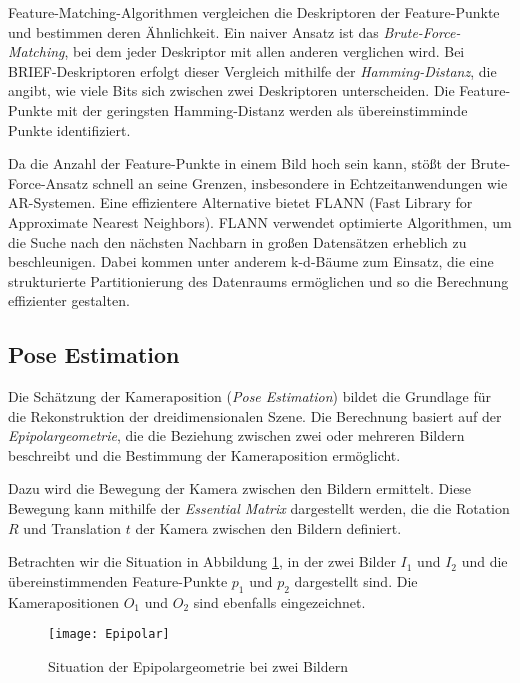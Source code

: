 Feature-Matching-Algorithmen vergleichen die Deskriptoren der Feature-Punkte und bestimmen deren Ähnlichkeit. Ein naiver Ansatz ist das \emph{Brute-Force-Matching}, bei dem jeder Deskriptor mit allen anderen verglichen wird. Bei BRIEF-Deskriptoren erfolgt dieser Vergleich mithilfe der \emph{Hamming-Distanz}, die angibt, wie viele Bits sich zwischen zwei Deskriptoren unterscheiden. Die Feature-Punkte mit der geringsten Hamming-Distanz werden als übereinstimminde Punkte identifiziert. \cite{gao2021vSLAM, szeliski2022computerVision}

Da die Anzahl der Feature-Punkte in einem Bild hoch sein kann, stößt der Brute-Force-Ansatz schnell an seine Grenzen, insbesondere in Echtzeitanwendungen wie AR-Systemen. Eine effizientere Alternative bietet FLANN (Fast Library for Approximate Nearest Neighbors). FLANN verwendet optimierte Algorithmen, um die Suche nach den nächsten Nachbarn in großen Datensätzen erheblich zu beschleunigen. Dabei kommen unter anderem k-d-Bäume zum Einsatz, die eine strukturierte Partitionierung des Datenraums ermöglichen und so die Berechnung effizienter gestalten. \cite{gao2021vSLAM, muja2009flann}

\subsection{Pose Estimation}

Die Schätzung der Kameraposition (\emph{Pose Estimation}) bildet die Grundlage für die Rekonstruktion der dreidimensionalen Szene. Die Berechnung basiert auf der \emph{Epipolargeometrie}, die die Beziehung zwischen zwei oder mehreren Bildern beschreibt und die Bestimmung der Kameraposition ermöglicht. \cite{gao2021vSLAM} 

Dazu wird die Bewegung der Kamera zwischen den Bildern ermittelt. Diese Bewegung kann mithilfe der \emph{Essential Matrix} dargestellt werden, die die Rotation \( R \) und Translation \( t \) der Kamera zwischen den Bildern definiert. \cite{gao2021vSLAM}

Betrachten wir die Situation in Abbildung \ref{fig:Epipolar}, in der zwei Bilder \( I_1 \) und \( I_2 \) und die übereinstimmenden Feature-Punkte \( p_1 \) und \( p_2 \) dargestellt sind. Die Kamerapositionen \( O_1 \) und \( O_2 \) sind ebenfalls eingezeichnet. \cite{gao2021vSLAM}

\begin{figure}
    \centering
    \texttt{[image: Epipolar]}
    \caption{Situation der Epipolargeometrie bei zwei Bildern\label{fig:Epipolar}}\par
\end{figure}

